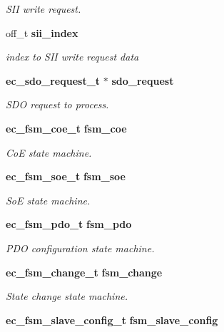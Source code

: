 \begin{DoxyCompactItemize}
\begin{DoxyCompactList}\small\item\em \-S\-I\-I write request. \end{DoxyCompactList}\item 
off\-\_\-t {\bf sii\-\_\-index}\label{structec__fsm__master_ad9050cec0823e4e0f4ac34effddd8d21}

\begin{DoxyCompactList}\small\item\em index to \-S\-I\-I write request data \end{DoxyCompactList}\item 
{\bf ec\-\_\-sdo\-\_\-request\-\_\-t} $\ast$ {\bf sdo\-\_\-request}
\begin{DoxyCompactList}\small\item\em \-S\-D\-O request to process. \end{DoxyCompactList}\item 
{\bf ec\-\_\-fsm\-\_\-coe\-\_\-t} {\bf fsm\-\_\-coe}\label{structec__fsm__master_a2bc8d2dd67be1dbddac6c20190e3632c}

\begin{DoxyCompactList}\small\item\em \-Co\-E state machine. \end{DoxyCompactList}\item 
{\bf ec\-\_\-fsm\-\_\-soe\-\_\-t} {\bf fsm\-\_\-soe}\label{structec__fsm__master_acab91592f35788b01419702634765b86}

\begin{DoxyCompactList}\small\item\em \-So\-E state machine. \end{DoxyCompactList}\item 
{\bf ec\-\_\-fsm\-\_\-pdo\-\_\-t} {\bf fsm\-\_\-pdo}
\begin{DoxyCompactList}\small\item\em \-P\-D\-O configuration state machine. \end{DoxyCompactList}\item 
{\bf ec\-\_\-fsm\-\_\-change\-\_\-t} {\bf fsm\-\_\-change}\label{structec__fsm__master_a64f30f383522a78b12151f803f39c552}

\begin{DoxyCompactList}\small\item\em \-State change state machine. \end{DoxyCompactList}\item 
{\bf ec\-\_\-fsm\-\_\-slave\-\_\-config\-\_\-t} {\bf fsm\-\_\-slave\-\_\-config}\label{structec__fsm__master_acd8d73f9c016a18c19eb120f8d691c62}


\end{DoxyCompactItemize}
